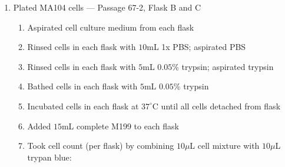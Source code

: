 \begin{enumerate}
	\item Plated MA104 cells --- Passage 67-2, Flask B and C
		\begin{enumerate}
			\item Aspirated cell culture medium from each flask
			\item Rinsed cells in each flask with $10$mL 1x PBS; aspirated PBS
			\item Rinsed cells in each flask with $5$mL $0.05$\% trypsin; aspirated trypsin
			\item Bathed cells in each flask with $5$mL $0.05$\% trypsin
			\item Incubated cells in each flask at $37^{\circ}$C until all cells detached from flask
			\item Added $15$mL complete M199 to each flask
			\item Took cell count (per flask) by combining $10\mu$L cell mixture with $10\mu$L trypan blue:
			

\end{enumerate}
\end{enumerate}
